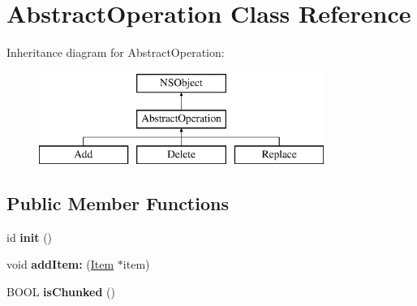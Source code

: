 \hypertarget{interface_abstract_operation}{
\section{\-Abstract\-Operation \-Class \-Reference}
\label{interface_abstract_operation}
}
\-Inheritance diagram for \-Abstract\-Operation\-:\begin{figure}[H]
\begin{center}
\leavevmode
\includegraphics[height=3.000000cm]{interface_abstract_operation}
\end{center}
\end{figure}
\subsection*{\-Public \-Member \-Functions}
\begin{DoxyCompactItemize}
\item 
\hypertarget{interface_abstract_operation_ab2a18c595a3e2c0215370029d3b8aeb4}{
id {\bfseries init} ()}
\label{interface_abstract_operation_ab2a18c595a3e2c0215370029d3b8aeb4}

\item 
\hypertarget{interface_abstract_operation_a26caacf26abf8335713fe1cfb5620062}{
void {\bfseries add\-Item\-:} (\hyperlink{interface_item}{\-Item} $\ast$item)}
\label{interface_abstract_operation_a26caacf26abf8335713fe1cfb5620062}

\item 
\hypertarget{interface_abstract_operation_a75e1b8c8f64ee5ace1131eaaf89c255f}{
\-B\-O\-O\-L {\bfseries is\-Chunked} ()}
\label{interface_abstract_operation_a75e1b8c8f64ee5ace1131eaaf89c255f}

\end{DoxyCompactItemize}

